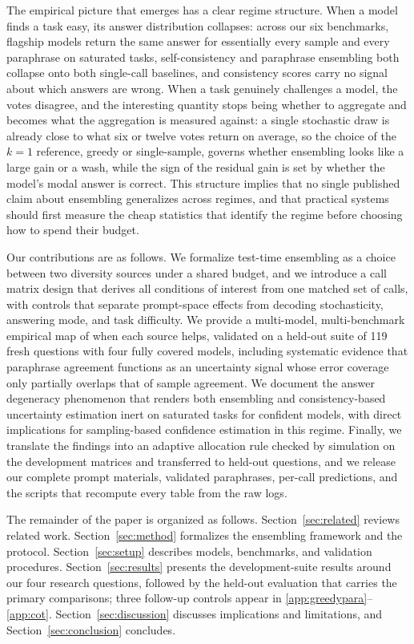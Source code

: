 The empirical picture that emerges has a clear regime structure. When a model finds a task easy, its answer distribution collapses: across our six benchmarks, flagship models return the same answer for essentially every sample and every paraphrase on saturated tasks, self-consistency and paraphrase ensembling both collapse onto both single-call baselines, and consistency scores carry no signal about which answers are wrong. When a task genuinely challenges a model, the votes disagree, and the interesting quantity stops being whether to aggregate and becomes what the aggregation is measured against: a single stochastic draw is already close to what six or twelve votes return on average, so the choice of the $k{=}1$ reference, greedy or single-sample, governs whether ensembling looks like a large gain or a wash, while the sign of the residual gain is set by whether the model's modal answer is correct. This structure implies that no single published claim about ensembling generalizes across regimes, and that practical systems should first measure the cheap statistics that identify the regime before choosing how to spend their budget.

Our contributions are as follows. We formalize test-time ensembling as a choice between two diversity sources under a shared budget, and we introduce a call matrix design that derives all conditions of interest from one matched set of calls, with controls that separate prompt-space effects from decoding stochasticity, answering mode, and task difficulty. We provide a multi-model, multi-benchmark empirical map of when each source helps, validated on a held-out suite of 119 fresh questions with four fully covered models, including systematic evidence that paraphrase agreement functions as an uncertainty signal whose error coverage only partially overlaps that of sample agreement. We document the answer degeneracy phenomenon that renders both ensembling and consistency-based uncertainty estimation inert on saturated tasks for confident models, with direct implications for sampling-based confidence estimation in this regime. Finally, we translate the findings into an adaptive allocation rule checked by simulation on the development matrices and transferred to held-out questions, and we release our complete prompt materials, validated paraphrases, per-call predictions, and the scripts that recompute every table from the raw logs.

The remainder of the paper is organized as follows. Section~\ref{sec:related} reviews related work. Section~\ref{sec:method} formalizes the ensembling framework and the protocol. Section~\ref{sec:setup} describes models, benchmarks, and validation procedures. Section~\ref{sec:results} presents the development-suite results around our four research questions, followed by the held-out evaluation that carries the primary comparisons; three follow-up controls appear in \ref{app:greedypara}--\ref{app:cot}. Section~\ref{sec:discussion} discusses implications and limitations, and Section~\ref{sec:conclusion} concludes.
